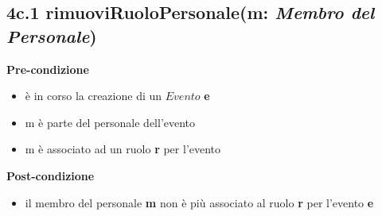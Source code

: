 \documentclass[12pt]{extarticle}
\begin{document}
\subsection*{4c.1 rimuoviRuoloPersonale(m: \textit{Membro del Personale})}
\textbf{Pre-condizione}
\begin{itemize}
  \item è in corso la creazione di un $Evento$ \textbf{e}
  \item m è parte del personale dell'evento
  \item m è associato ad un ruolo \textbf{r} per l'evento
\end{itemize}
\textbf{Post-condizione}
\begin{itemize}
  \item il membro del personale \textbf{m} non è più associato al ruolo \textbf{r} per l'evento \textbf{e} 
\end{itemize}
\end{document}
